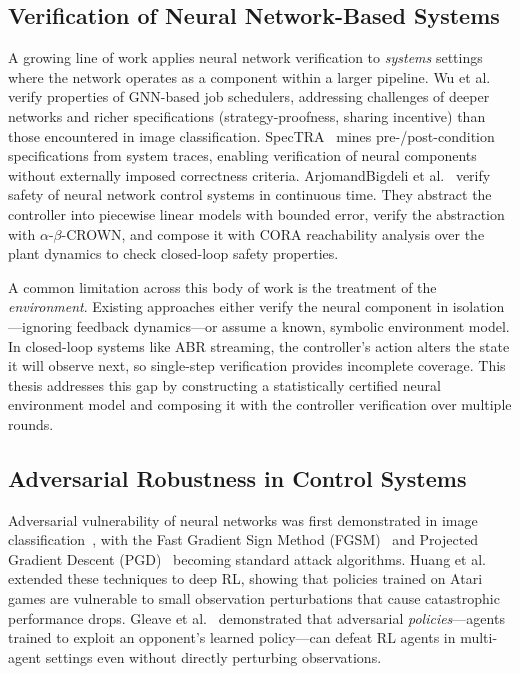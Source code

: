 \documentclass[thesis]{uofithesis} %
\begin{document}
    \subsection{Verification of Neural Network-Based Systems}
    \label{sec:related-nn4sys}

    A growing line of work applies neural network verification to
    \emph{systems} settings where the network operates as a component
    within a larger pipeline.  Wu et al.~\cite{splitting} verify
    properties of GNN-based job schedulers, addressing challenges of
    deeper networks and richer specifications (strategy-proofness,
    sharing incentive) than those encountered in image classification.
    SpecTRA~\cite{spec-tra} mines pre-/post-condition specifications
    from system traces, enabling verification of neural components
    without externally imposed correctness criteria.
    ArjomandBigdeli et al.~\cite{nn4sys-verification} verify safety of
    neural network control systems in continuous time.  They abstract
    the controller into piecewise linear models with bounded error,
    verify the abstraction with $\alpha$-$\beta$-CROWN, and compose it
    with CORA reachability analysis over the plant dynamics to check
    closed-loop safety properties.

    A common limitation across this body of work is the treatment of
    the \emph{environment}.  Existing approaches either verify the
    neural component in isolation---ignoring feedback
    dynamics---or assume a known, symbolic environment model.  In
    closed-loop systems like ABR streaming, the controller's action
    alters the state it will observe next, so single-step verification
    provides incomplete coverage.  This thesis addresses this gap by
    constructing a statistically certified neural environment model and
    composing it with the controller verification over multiple rounds.


    \subsection{Adversarial Robustness in Control Systems}
    \label{sec:related-adversarial}

    Adversarial vulnerability of neural networks was first
    demonstrated in image classification~\cite{attack}, with the Fast
    Gradient Sign Method (FGSM)~\cite{goodfellow-fgsm} and Projected
    Gradient Descent (PGD)~\cite{pgd} becoming standard attack
    algorithms.  Huang et al.~\cite{huang-adversarial-rl} extended
    these techniques to deep RL, showing that policies trained on Atari
    games are vulnerable to small observation perturbations that cause
    catastrophic performance drops.  Gleave et
    al.~\cite{gleave-adversarial-policies} demonstrated that
    adversarial \emph{policies}---agents trained to exploit an
    opponent's learned policy---can defeat RL agents in multi-agent
    settings even without directly perturbing observations.
\end{document}
